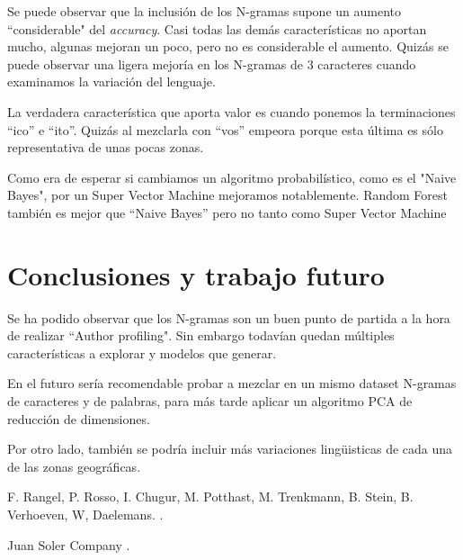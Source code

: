 \documentclass[11pt,a4paper]{article}
\begin{document}
Se puede observar que la inclusión de los N-gramas supone un aumento ``considerable" del \emph{accuracy}. Casi todas las demás características no aportan mucho, algunas mejoran un poco, pero no es considerable el aumento. Quizás se puede observar una ligera mejoría en los N-gramas de 3 caracteres cuando examinamos la variación del lenguaje.

La verdadera característica que aporta valor es cuando ponemos la terminaciones ``ico'' e ``ito''. Quizás al mezclarla con ``vos'' empeora porque esta última es sólo representativa de unas pocas zonas.

Como era de esperar si cambiamos un algoritmo probabilístico, como es el "Naive Bayes", por un Super Vector Machine mejoramos notablemente. Random Forest también es mejor que ``Naive Bayes'' pero no tanto como Super Vector Machine

\section{Conclusiones y trabajo futuro}

Se ha podido observar que los N-gramas son un buen punto de partida a la hora de realizar ``Author profiling". Sin embargo todavían quedan múltiples características a explorar y modelos que generar.

En el futuro sería recomendable probar a mezclar en un mismo dataset N-gramas de caracteres y de palabras, para más tarde aplicar un algoritmo PCA de reducción de dimensiones.

Por otro lado, también se podría incluir más variaciones lingüisticas de cada una de las zonas geográficas.


\begin{thebibliography}{}

F. Rangel, P. Rosso, I. Chugur, M. Potthast, M. Trenkmann, B. Stein, B. Verhoeven, W, Daelemans.
.

Juan Soler Company
.

\end{thebibliography}
\end{document}
